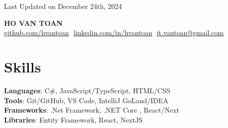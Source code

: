 \documentclass[letterpaper,11pt]{article}
\begin{document}
\begin{flushright}
  \vspace{-4pt}
  \color{gray}
  \item
  Last Updated on December 24th, 2024
\end{flushright}

\vspace{-5pt}

\begin{center}
  \textbf{\Huge\scshape{HO VAN TOAN}}\vspace{8pt} \\
  \small
  \href{https://github.com/hvantoan}{\underline{github.com/hvantoan}} $  $
  \href{https://linkedin.com/in/hvantoan}{\underline{linkedin.com/in/hvantoan}} $  $
  \href{mailto:it.vantoan@gmail.com}
  {\underline{it.vantoan@gmail.com}}
\end{center}

\section{Skills}
\begin{itemize}[leftmargin=0.15in, label={}]
  \small{\item{
        \textbf{Languages}{: C\#, JavaScript/TypeScript, HTML/CSS} \\
        \textbf{Tools}{: Git/GitHub, VS Code, IntelliJ GoLand/IDEA}\\
        \textbf{Frameworks}{: .Net Framework, .NET Core , React/Next} \\
        \textbf{Libraries}{: Entity Framework, React, NextJS  }\\
        }}
\end{itemize}

\end{document}

